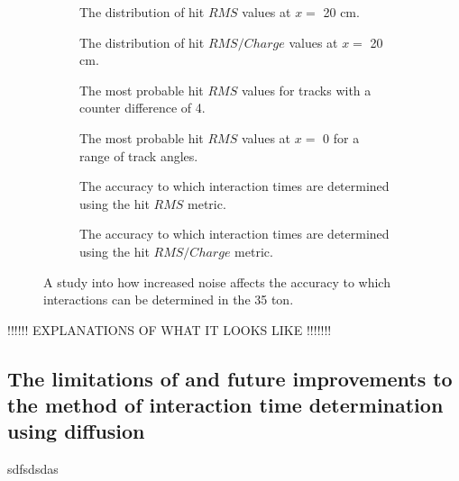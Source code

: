 \begin{figure}[h!]
  \centering  \begin{subfigure}{0.45\textwidth}
    \centering
    \caption{The distribution of hit $RMS$ values at $x =$ 20 cm.}
    \label{fig:DiffEFieldComp1}
  \end{subfigure}
  \hspace{0.08\textwidth}
  \begin{subfigure}{0.45\textwidth}
    \centering
    \caption{The distribution of hit $RMS/Charge$ values at $x =$ 20 cm.}
    \label{fig:DiffEFieldComp2}
  \end{subfigure}
  \begin{subfigure}{0.45\textwidth}
    \centering
    \caption{The most probable hit $RMS$ values for tracks with a counter difference of 4.}
    \label{fig:DiffEFieldComp3}
  \end{subfigure}
  \hspace{0.08\textwidth}
  \begin{subfigure}{0.45\textwidth}
    \centering
    \caption{The most probable hit $RMS$ values at $x = $ 0 for a range of track angles.}
    \label{fig:DiffEFieldComp4}
  \end{subfigure}
  \begin{subfigure}{0.45\textwidth}
    \centering
    \caption{The accuracy to which interaction times are determined using the hit $RMS$ metric.}
    \label{fig:DiffEFieldComp5}
  \end{subfigure}
  \hspace{0.08\textwidth}
  \begin{subfigure}{0.45\textwidth}
    \centering
    \caption{The accuracy to which interaction times are determined using the hit $RMS/Charge$ metric.}
    \label{fig:DiffEFieldComp6}
  \end{subfigure}
  \caption[The effect that an increased electric field has on the accuracy of interaction time determination]
          {A study into how increased noise affects the accuracy to which interactions can be determined in the 35 ton.}
          \label{fig:DiffEFieldComp}
\end{figure}

!!!!!! EXPLANATIONS OF WHAT IT LOOKS LIKE !!!!!!!

\subsection{The limitations of and future improvements to the method of interaction time determination using diffusion} \label{sec:DiffLimitations}
sdfsdsdas
